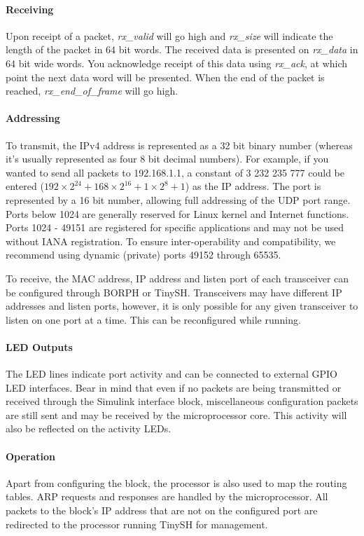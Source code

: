 {\paragraph{Receiving}
Upon receipt of a packet, \textit{rx\_valid} will go high and \textit{rx\_size} will indicate the length of the packet in 64 bit words. The received data is presented on \textit{rx\_data} in 64 bit wide words. You acknowledge receipt of this data using \textit{rx\_ack}, at which point the next data word will be presented. When the end of the packet is reached, \textit{rx\_end\_of\_frame} will go high.

\paragraph{Addressing}
To transmit, the IPv4 address is represented as a 32 bit binary number (whereas it's usually represented as four 8 bit decimal numbers). For example, if you wanted to send all packets to 192.168.1.1, a constant of 3 232 235 777 could be entered ($192\times2^{24} + 168\times2^{16} + 1\times2^8 + 1$) as the IP address. The port is represented by a 16 bit number, allowing full addressing of the UDP port range. Ports below 1024 are generally reserved for Linux kernel and Internet functions. Ports 1024 - 49151 are registered for specific applications and may not be used without IANA registration. To ensure inter-operability and compatibility, we recommend using dynamic (private) ports 49152 through 65535.

To receive, the MAC address, IP address and listen port of each transceiver can be configured through BORPH or TinySH. Transceivers may have different IP addresses and listen ports, however, it is only possible for any given transceiver to listen on one port at a time. This can be reconfigured while running.

\paragraph{LED Outputs}
The LED lines indicate port activity and can be connected to external GPIO LED interfaces. Bear in mind that even if no packets are being transmitted or received through the Simulink interface block, miscellaneous configuration packets are still sent and may be received by the microprocessor core. This activity will also be reflected on the activity LEDs.

\paragraph{Operation}
Apart from configuring the block, the processor is also used to map the routing tables. ARP requests and responses are handled by the microprocessor. All packets to the block's IP address that are not on the configured port are redirected to the processor running TinySH for management. 

}
